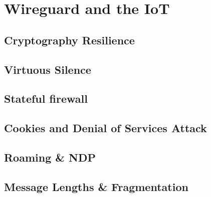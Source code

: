 \chapter{Wireguard and the IoT}
\section{Cryptography Resilience}
\section{Virtuous Silence}
\section{Stateful firewall}
\section{Cookies and Denial of Services Attack} \label{iot:cookie}
\section{Roaming \& NDP}
\section{Message Lengths \& Fragmentation}
